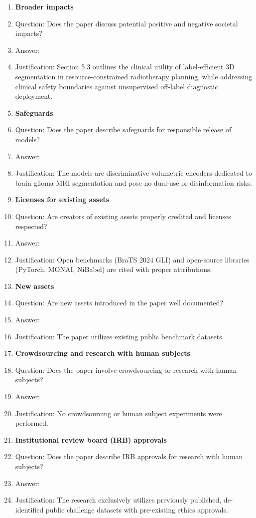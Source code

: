\begin{enumerate}
\item {\bf Broader impacts}
    \item[] Question: Does the paper discuss potential positive and negative societal impacts?
    \item[] Answer: \answerYes{}
    \item[] Justification: Section 5.3 outlines the clinical utility of label-efficient 3D segmentation in resource-constrained radiotherapy planning, while addressing clinical safety boundaries against unsupervised off-label diagnostic deployment.

\item {\bf Safeguards}
    \item[] Question: Does the paper describe safeguards for responsible release of models?
    \item[] Answer: \answerNA{}
    \item[] Justification: The models are discriminative volumetric encoders dedicated to brain glioma MRI segmentation and pose no dual-use or disinformation risks.

\item {\bf Licenses for existing assets}
    \item[] Question: Are creators of existing assets properly credited and licenses respected?
    \item[] Answer: \answerYes{}
    \item[] Justification: Open benchmarks (BraTS 2024 GLI) and open-source libraries (PyTorch, MONAI, NiBabel) are cited with proper attributions.

\item {\bf New assets}
    \item[] Question: Are new assets introduced in the paper well documented?
    \item[] Answer: \answerNA{}
    \item[] Justification: The paper utilizes existing public benchmark datasets.

\item {\bf Crowdsourcing and research with human subjects}
    \item[] Question: Does the paper involve crowdsourcing or research with human subjects?
    \item[] Answer: \answerNA{}
    \item[] Justification: No crowdsourcing or human subject experiments were performed.

\item {\bf Institutional review board (IRB) approvals}
    \item[] Question: Does the paper describe IRB approvals for research with human subjects?
    \item[] Answer: \answerNA{}
    \item[] Justification: The research exclusively utilizes previously published, de-identified public challenge datasets with pre-existing ethics approvals.


\end{enumerate}
